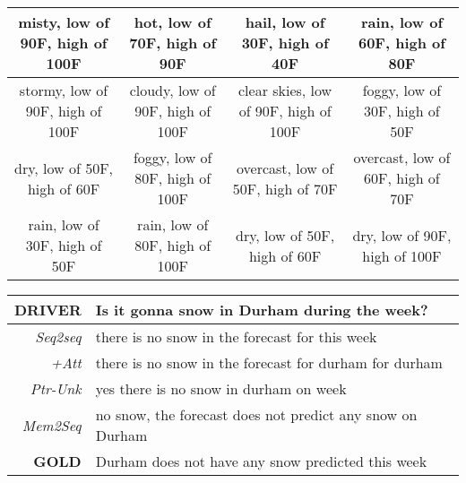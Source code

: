 \documentclass[11pt,a4paper]{article}
\begin{document}
\begin{table}[H]
{\begin{tabular}{|c|c|c|c|}
misty, low of 90F, high of 100F      & hot, low of 70F, high of 90F     & hail, low of 30F, high of 40F         & rain, low of 60F, high of 80F     \\ \hline
stormy, low of 90F, high of 100F     & cloudy, low of 90F, high of 100F & clear skies, low of 90F, high of 100F & foggy, low of 30F, high of 50F    \\ \hline
dry, low of 50F, high of 60F         & foggy, low of 80F, high of 100F  & overcast, low of 50F, high of 70F     & overcast, low of 60F, high of 70F \\ \hline
rain, low of 30F, high of 50F        & rain, low of 80F, high of 100F   & dry, low of 50F, high of 60F          & dry, low of 90F, high of 100F     \\ \hline
\end{tabular}
}

\begin{tabular}{r|l}
\hline
\textbf{DRIVER}      & Is it gonna snow in Durham during the week?                \\ \hline
\textit{Seq2seq}     & there is no snow in the forecast for this week             \\
\textit{+Att}        & there is no snow in the forecast for durham for durham     \\
\textit{Ptr-Unk}      & yes there is no snow in durham on week                     \\ \hline
\textit{Mem2Seq} & no snow, the forecast does not predict any snow on Durham  \\ \hline
\textbf{GOLD}        & Durham does not have any snow predicted this week          \\ \hline
\end{tabular}
\end{table}
\end{document}

